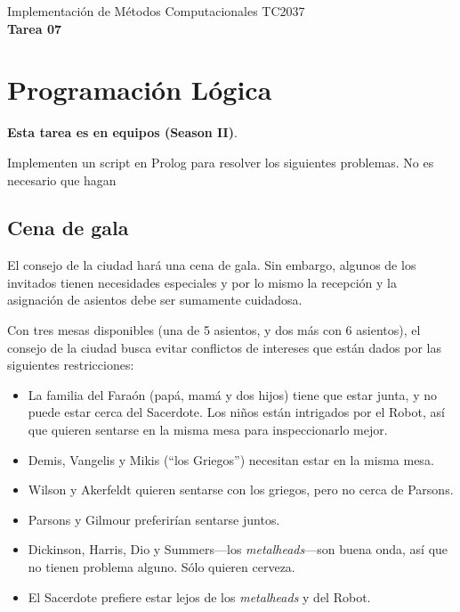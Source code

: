\documentclass[]{book}
\theoremstyle{definition}
\begin{document}
\begin{center}
{\huge Implementación de Métodos Computacionales TC2037}\\[1.5ex]
{\large \textbf{Tarea 07}\\[1.5ex] %
} %
\end{center}

\vspace{0.2 cm}

\section*{Programación Lógica}

\textbf{Esta tarea es en equipos (Season II)}.
\vspace{4ex}

Implementen un script en Prolog para resolver los siguientes problemas. No es necesario que hagan 

\subsection*{Cena de gala}

El consejo de la ciudad hará una cena de gala. Sin embargo, algunos de los invitados tienen necesidades especiales y por lo mismo la recepción y la asignación de asientos debe ser sumamente cuidadosa.

Con tres mesas disponibles (una de 5 asientos, y dos más con 6 asientos), el consejo de la ciudad busca evitar conflictos de intereses que están dados por las siguientes restricciones:

\begin{itemize}
    \item La familia del Faraón (papá, mamá y dos hijos) tiene que estar junta, y no puede estar cerca del Sacerdote. Los niños están intrigados por el Robot, así que quieren sentarse en la misma mesa para inspeccionarlo mejor.
    \item Demis, Vangelis y Mikis (``los Griegos'') necesitan estar en la misma mesa.
    \item Wilson y Akerfeldt quieren sentarse con los griegos, pero no cerca de Parsons.
    \item Parsons y Gilmour preferirían sentarse juntos.
    \item Dickinson, Harris, Dio y Summers---los \textit{metalheads}---son buena onda, así que no tienen problema alguno. Sólo quieren cerveza.
    \item El Sacerdote prefiere estar lejos de los \textit{metalheads} y del Robot.
\end{itemize}
\end{document}

